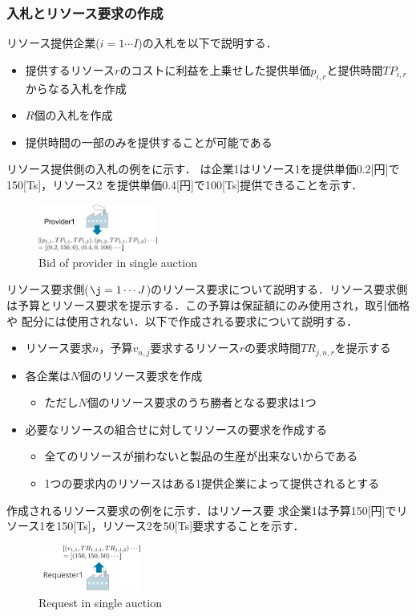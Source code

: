 \documentclass{ujarticle}
\begin{document}
\subsubsection{入札とリソース要求の作成}
リソース提供企業($i=1 \cdots I$)の入札を以下で説明する．
\begin{itemize}
\item {提供するリソース$r$のコストに利益を上乗せした提供単価$p_{i,r}$と提供時間$TP_{i,r}$からなる入札を作成}
\item {$R$個の入札を作成}
\item {提供時間の一部のみを提供することが可能である}
\end{itemize}
リソース提供側の入札の例をに示す．
は企業1はリソース1を提供単価0.2[円]で150[Ts]，リソース2
を提供単価0.4[円]で100[Ts]提供できることを示す．
\par
\begin{figure}[htb]
  \centering
  \includegraphics[width=0.35\textwidth]{bid-provider-single.pdf} 
  \caption{Bid of provider in single auction}
  \label{fig:bid-provider-single}
\end{figure}
リソース要求側($\j=1 \cdots J$)のリソース要求について説明する．リソース要求側は予算とリソース要求を提示する．この予算は保証額にのみ使用され，取引価格や
配分には使用されない．以下で作成される要求について説明する．
\begin{itemize}
\item {リソース要求$n$，予算$v_{n,j}$要求するリソース$r$の要求時間$TR_{j,n,r}$を提示する} 
\item {各企業は$N$個のリソース要求を作成}
  \begin{itemize}
  \item {ただし$N$個のリソース要求のうち勝者となる要求は1つ} 
  \end{itemize}
\item {必要なリソースの組合せに対してリソースの要求を作成する}
    \begin{itemize}
    \item {全てのリソースが揃わないと製品の生産が出来ないからである}
    \item {1つの要求内のリソースはある1提供企業によって提供されるとする}
    \end{itemize}
\end{itemize}
作成されるリソース要求の例をに示す．はリソース要
求企業1は予算150[円]でリソース1を150[Ts]，リソース2を50[Ts]要求することを示す．
\begin{figure}[htb]
  \centering
  \includegraphics[width=0.3\textwidth]{bid-requester.pdf} 
  \caption{Request in single auction}
  \label{fig:request}
\end{figure}
\end{document}
